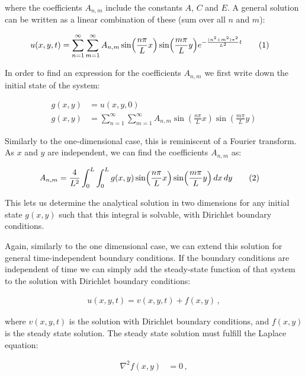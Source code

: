 \documentclass[reprint,english,notitlepage]{revtex4-1}  %
\newcommand\numberthis{\addtocounter{equation}{1}\tag{\theequation}}
\begin{document}
where the coefficients $A_{n,m}$ include the constants $A$, $C$ and $E$. A general solution can be written as a linear combination of these (sum over all $n$ and $m$):

\begin{align*}
u(x,y,t) &= \sum\limits_{n=1}^\infty \sum\limits_{m=1}^\infty A_{n,m} \sin (\frac{n\pi}{L} x)  \sin (\frac{m\pi}{L} y) e^{-\frac{(n^2 + m^2)\pi^2}{L^2} t} \numberthis \label{eq:2D_diffusion_equation_analytical_solution}
\end{align*} 

In order to find an expression for the coefficients $A_{n,m}$ we first write down the initial state of the system:

\begin{align*}
g(x,y) &= u(x,y,0) \\
g(x,y) &= \sum\limits_{n=1}^\infty \sum\limits_{m=1}^\infty A_{n,m} \sin (\frac{n\pi}{L} x)  \sin (\frac{m\pi}{L} y)
\end{align*}

Similarly to the one-dimensional case, this is reminiscent of a Fourier transform. As $x$ and $y$ are independent, we can find the coefficients $A_{n,m}$ as:

\begin{align*}
A_{n,m} &= \frac{4}{L^2} \int_0^L \int_0^L g(x,y) \sin( \frac{n\pi}{L} x) \sin (\frac{m\pi}{L} y) \, dx \, dy \numberthis \label{eq:2D_diffusion_equation_analytical_coefficients}
\end{align*}

This lets us determine the analytical solution in two dimensions for any initial state $g(x,y)$ such that this integral is solvable, with Dirichlet boundary conditions.

Again, similarly to the one dimensional case, we can extend this solution for general time-independent boundary conditions. If the boundary conditions are independent of time we can simply add the steady-state function of that system to the solution with Dirichlet boundary conditions:

\begin{align*}
u(x,y,t) = v(x,y,t) + f(x,y) \, ,
\end{align*}

where $v(x,y,t)$ is the solution with Dirichlet boundary conditions, and $f(x,y)$ is the steady state solution. The steady state solution must fulfill the Laplace equation:

\begin{align*}
\nabla^2 f(x,y) &= 0 \, ,
\end{align*}
\end{document}
